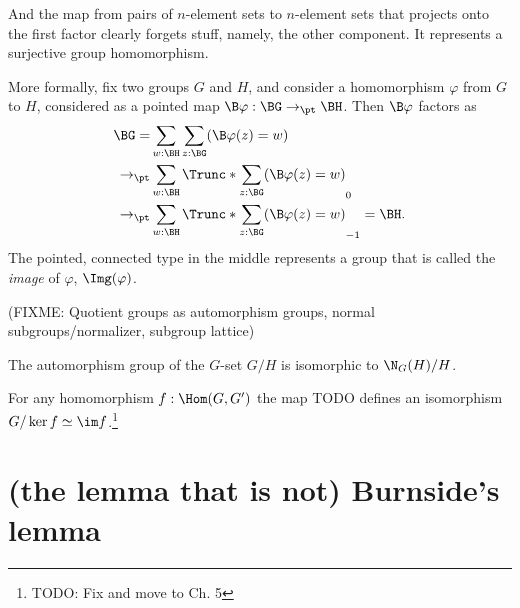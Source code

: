 And the map from pairs of $n$-element sets to $n$-element sets
that projects onto the first factor clearly forgets stuff,
namely, the other component.
It represents a surjective group homomorphism.

More formally, fix two groups $G$ and $H$,
and consider a homomorphism $\varphi$ from $G$ to $H$,
considered as a pointed map $\B\varphi : \BG \to_\pt \BH$.
Then $\B\varphi$ factors as
\begin{align*}
  \BG
  = &\sum_{w:\BH}\sum_{z:\BG}(\B\varphi(z)=w)\\
  \to_\pt &\sum_{w:\BH}\Trunc*{\sum_{z:\BG}(\B\varphi(z)=w)}_0\\
  \to_\pt &\sum_{w:\BH}\Trunc*{\sum_{z:\BG}(\B\varphi(z)=w)}_{-1} = \BH.
\end{align*}
The pointed, connected type in the middle represents a group
that is called the \emph{image} of $\varphi$, $\Img(\varphi)$.


(FIXME: Quotient groups as automorphism groups, normal subgroups/normalizer, subgroup lattice)

\begin{lemma}
  \label{lem:aut-orbit}
  The automorphism group of the $G$-set $G/H$ is isomorphic to $\N_G(H)/H$.
\end{lemma}

\begin{theorem}
  \label{thm:fund-thm-homs}
  For any homomorphism $f : \Hom(G,G')$
  the map {\color{blue} TODO} defines an isomorphism
  $G/\ker f \simeq \im f$.\footnote{TODO: Fix and move to Ch. 5}
\end{theorem}

\section{(the lemma that is not) Burnside's lemma}
\label{sec:burnsides-lemma}
\label{lem:burnsides-lemma}

